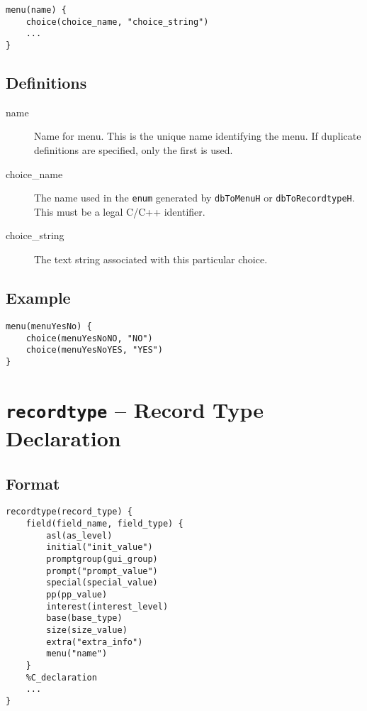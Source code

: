 \begin{verbatim}
menu(name) {
    choice(choice_name, "choice_string")
    ...
}
\end{verbatim}

\subsection{Definitions}

\begin{description}
\item [name] Name for menu. This is the unique name identifying the menu.
If duplicate definitions are specified, only the first is used.

\item [choice\_name] The name used in the \verb|enum| generated by \verb|dbToMenuH| or \verb|dbToRecordtypeH|.
This must be a legal C/C++ identifier.

\item [choice\_string] The text string associated with this particular choice.
\end{description}

\subsection{Example}

\begin{verbatim}
menu(menuYesNo) {
    choice(menuYesNoNO, "NO")
    choice(menuYesNoYES, "YES")
}
\end{verbatim}

\section{\texttt{recordtype} -- Record Type Declaration}

\subsection{Format}

\begin{verbatim}
recordtype(record_type) {
    field(field_name, field_type) {
        asl(as_level)
        initial("init_value")
        promptgroup(gui_group)
        prompt("prompt_value")
        special(special_value)
        pp(pp_value)
        interest(interest_level)
        base(base_type)
        size(size_value)
        extra("extra_info")
        menu("name")
    }
    %C_declaration
    ...
}
\end{verbatim}

